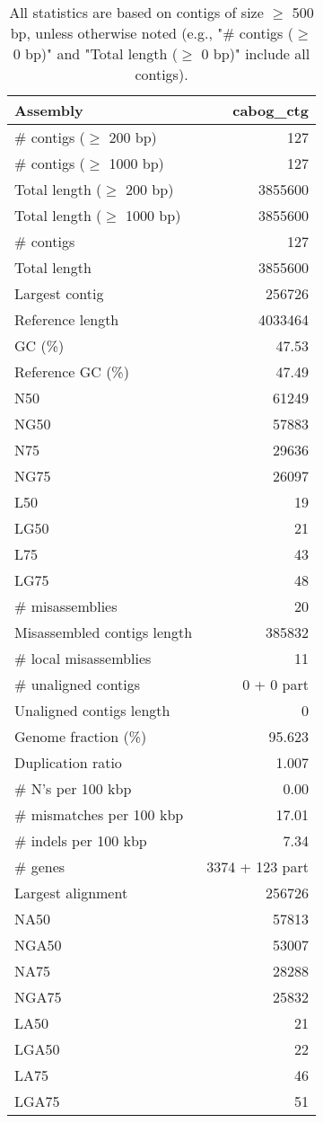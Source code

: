 \documentclass[12pt,a4paper]{article}
\begin{document}
\begin{table}[ht]
\begin{center}
\caption{All statistics are based on contigs of size $\geq$ 500 bp, unless otherwise noted (e.g., "\# contigs ($\geq$ 0 bp)" and "Total length ($\geq$ 0 bp)" include all contigs).}
\begin{tabular}{|l*{1}{|r}|}
\hline
Assembly & cabog\_ctg \\ \hline
\# contigs ($\geq$ 200 bp) & 127 \\ \hline
\# contigs ($\geq$ 1000 bp) & 127 \\ \hline
Total length ($\geq$ 200 bp) & 3855600 \\ \hline
Total length ($\geq$ 1000 bp) & 3855600 \\ \hline
\# contigs & 127 \\ \hline
Total length & 3855600 \\ \hline
Largest contig & 256726 \\ \hline
Reference length & 4033464 \\ \hline
GC (\%) & 47.53 \\ \hline
Reference GC (\%) & 47.49 \\ \hline
N50 & 61249 \\ \hline
NG50 & 57883 \\ \hline
N75 & 29636 \\ \hline
NG75 & 26097 \\ \hline
L50 & 19 \\ \hline
LG50 & 21 \\ \hline
L75 & 43 \\ \hline
LG75 & 48 \\ \hline
\# misassemblies & 20 \\ \hline
Misassembled contigs length & 385832 \\ \hline
\# local misassemblies & 11 \\ \hline
\# unaligned contigs & 0 + 0 part \\ \hline
Unaligned contigs length & 0 \\ \hline
Genome fraction (\%) & 95.623 \\ \hline
Duplication ratio & 1.007 \\ \hline
\# N's per 100 kbp & 0.00 \\ \hline
\# mismatches per 100 kbp & 17.01 \\ \hline
\# indels per 100 kbp & 7.34 \\ \hline
\# genes & 3374 + 123 part \\ \hline
Largest alignment & 256726 \\ \hline
NA50 & 57813 \\ \hline
NGA50 & 53007 \\ \hline
NA75 & 28288 \\ \hline
NGA75 & 25832 \\ \hline
LA50 & 21 \\ \hline
LGA50 & 22 \\ \hline
LA75 & 46 \\ \hline
LGA75 & 51 \\ \hline
\end{tabular}
\end{center}
\end{table}
\end{document}
